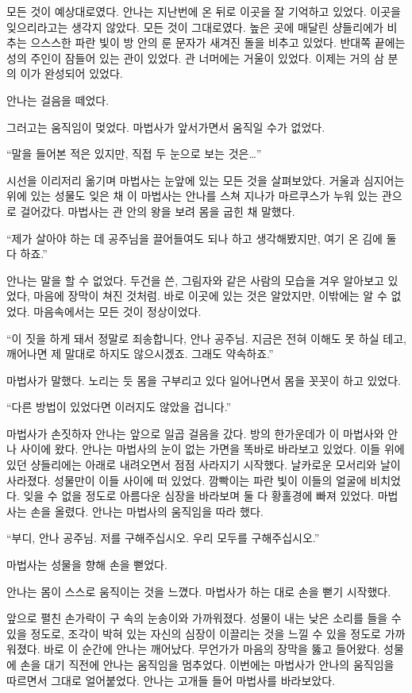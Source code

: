 모든 것이 예상대로였다. 안나는 지난번에 온 뒤로 이곳을 잘 기억하고 있었다. 이곳을 잊으리라고는 생각지 않았다. 모든 것이 그대로였다. 높은 곳에 매달린 샹들리에가 비추는 으스스한 파란 빛이 방 안의 룬 문자가 새겨진 돌을 비추고 있었다. 반대쪽 끝에는 성의 주인이 잠들어 있는 관이 있었다. 관 너머에는 거울이 있었다. 이제는 거의 삼 분의 이가 완성되어 있었다.

안나는 걸음을 떼었다.

그러고는 움직임이 멎었다. 마법사가 앞서가면서 움직일 수가 없었다.

``말을 들어본 적은 있지만, 직접 두 눈으로 보는 것은\ldots''

시선을 이리저리 옮기며 마법사는 눈앞에 있는 모든 것을 살펴보았다. 거울과 심지어는 위에 있는 성물도 잊은 채 이 마법사는 안나를 스쳐 지나가 마르쿠스가 누워 있는 관으로 걸어갔다. 마법사는 관 안의 왕을 보려 몸을 굽힌 채 말했다.

``제가 살아야 하는 데 공주님을 끌어들여도 되나 하고 생각해봤지만, 여기 온 김에 둘 다 하죠.''

안나는 말을 할 수 없었다. 두건을 쓴, 그림자와 같은 사람의 모습을 겨우 알아보고 있었다, 마음에 장막이 쳐진 것처럼. 바로 이곳에 있는 것은 알았지만, 이밖에는 알 수 없었다. 마음속에서는 모든 것이 정상이었다.

``이 짓을 하게 돼서 정말로 죄송합니다, 안나 공주님. 지금은 전혀 이해도 못 하실 테고, 깨어나면 제 말대로 하지도 않으시겠죠. 그래도 약속하죠.''

마법사가 말했다. 노리는 듯 몸을 구부리고 있다 일어나면서 몸을 꼿꼿이 하고 있었다.

``다른 방법이 있었다면 이러지도 않았을 겁니다.''

마법사가 손짓하자 안나는 앞으로 일곱 걸음을 갔다. 방의 한가운데가 이 마법사와 안나 사이에 왔다. 안나는 마법사의 눈이 없는 가면을 똑바로 바라보고 있었다. 이들 위에 있던 샹들리에는 아래로 내려오면서 점점 사라지기 시작했다. 날카로운 모서리와 날이 사라졌다. 성물만이 이들 사이에 떠 있었다. 깜빡이는 파란 빛이 이들의 얼굴에 비치었다. 잊을 수 없을 정도로 아름다운 심장을 바라보며 둘 다 황홀경에 빠져 있었다. 마법사는 손을 올렸다. 안나는 마법사의 움직임을 따라 했다.

``부디, 안나 공주님. 저를 구해주십시오. 우리 모두를 구해주십시오.''

마법사는 성물을 향해 손을 뻗었다.

안나는 몸이 스스로 움직이는 것을 느꼈다. 마법사가 하는 대로 손을 뻗기 시작했다.

앞으로 펼친 손가락이 구 속의 눈송이와 가까워졌다. 성물이 내는 낮은 소리를 들을 수 있을 정도로, 조각이 박혀 있는 자신의 심장이 이끌리는 것을 느낄 수 있을 정도로 가까워졌다. 바로 이 순간에 안나는 깨어났다. 무언가가 마음의 장막을 뚫고 들어왔다. 성물에 손을 대기 직전에 안나는 움직임을 멈추었다. 이번에는 마법사가 안나의 움직임을 따르면서 그대로 얼어붙었다. 안나는 고개들 들어 마법사를 바라보았다.

